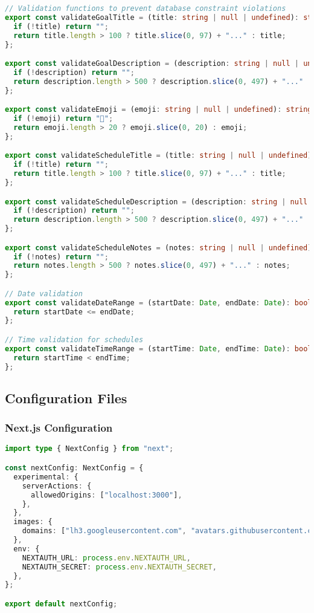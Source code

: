 \begin{lstlisting}[language=TypeScript, caption=app/lib/validation.ts - Data Validation]
// Validation functions to prevent database constraint violations
export const validateGoalTitle = (title: string | null | undefined): string => {
  if (!title) return "";
  return title.length > 100 ? title.slice(0, 97) + "..." : title;
};

export const validateGoalDescription = (description: string | null | undefined): string => {
  if (!description) return "";
  return description.length > 500 ? description.slice(0, 497) + "..." : description;
};

export const validateEmoji = (emoji: string | null | undefined): string => {
  if (!emoji) return "🎯";
  return emoji.length > 20 ? emoji.slice(0, 20) : emoji;
};

export const validateScheduleTitle = (title: string | null | undefined): string => {
  if (!title) return "";
  return title.length > 100 ? title.slice(0, 97) + "..." : title;
};

export const validateScheduleDescription = (description: string | null | undefined): string => {
  if (!description) return "";
  return description.length > 500 ? description.slice(0, 497) + "..." : description;
};

export const validateScheduleNotes = (notes: string | null | undefined): string => {
  if (!notes) return "";
  return notes.length > 500 ? notes.slice(0, 497) + "..." : notes;
};

// Date validation
export const validateDateRange = (startDate: Date, endDate: Date): boolean => {
  return startDate <= endDate;
};

// Time validation for schedules
export const validateTimeRange = (startTime: Date, endTime: Date): boolean => {
  return startTime < endTime;
};
\end{lstlisting}

\subsection{Configuration Files}

\subsubsection{Next.js Configuration}

\begin{lstlisting}[language=TypeScript, caption=next.config.ts]
import type { NextConfig } from "next";

const nextConfig: NextConfig = {
  experimental: {
    serverActions: {
      allowedOrigins: ["localhost:3000"],
    },
  },
  images: {
    domains: ["lh3.googleusercontent.com", "avatars.githubusercontent.com"],
  },
  env: {
    NEXTAUTH_URL: process.env.NEXTAUTH_URL,
    NEXTAUTH_SECRET: process.env.NEXTAUTH_SECRET,
  },
};

export default nextConfig;
\end{lstlisting}

